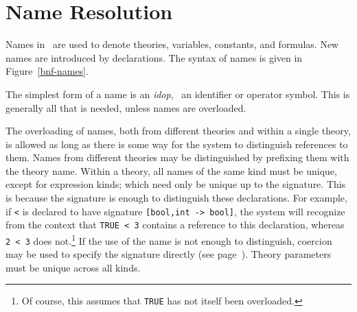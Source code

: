 
\chapter{Name Resolution}\label{names}\label{resolution}

Names in \pvs\ are used to denote theories, variables, constants, and
formulas.  New names are introduced by declarations.  The syntax of names
is given in Figure~\ref{bnf-names}.


The simplest form of a name is an \emph{idop}, \ie\ an identifier or
operator symbol.  This is generally all that is needed, unless names are
overloaded.

The overloading of names, both from different theories and within a single
theory, is allowed as long as there is some way for the system to
distinguish references to them.  Names from different theories may be
distinguished by prefixing them with the theory name.  Within a theory,
all names of the same kind must be unique, except for expression kinds;
which need only be unique up to the signature.  This is because the
signature is enough to distinguish these declarations.  For example, if
{\tt <} is declared to have signature {\tt [bool,int -> bool]}, the system
will recognize from the context that {\tt TRUE < 3} contains a reference
to this declaration, whereas {\tt 2 < 3} does not.\footnote{Of course,
this assumes that \texttt{TRUE} has not itself been overloaded.}  If the
use of the name is not enough to distinguish, coercion may be used to
specify the signature directly (see page~\pageref{coercions}).  Theory
parameters must be unique across all kinds.

